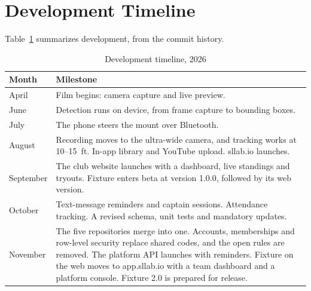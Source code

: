 \documentclass[letterpaper,11pt]{article}
\begin{document}


\section{Development Timeline}\label{a:timeline}

Table~\ref{t:timeline} summarizes development, from the commit history.

\begin{table}[H]
\caption{Development timeline, 2026}\label{t:timeline}
\footnotesize
\begin{tabularx}{\linewidth}{@{}l X@{}}
\toprule
Month & Milestone \\
\midrule
April & Film begins: camera capture and live preview. \\
June & Detection runs on device, from frame capture to bounding boxes. \\
July & The phone steers the mount over Bluetooth. \\
August & Recording moves to the ultra-wide camera, and tracking works at 10--15~ft. In-app library and YouTube upload. sllab.io launches. \\
September & The club website launches with a dashboard, live standings and tryouts. Fixture enters beta at version 1.0.0, followed by its web version. \\
October & Text-message reminders and captain sessions. Attendance tracking. A revised schema, unit tests and mandatory updates. \\
November & The five repositories merge into one. Accounts, memberships and row-level security replace shared codes, and the open rules are removed. The platform API launches with reminders. Fixture on the web moves to app.sllab.io with a team dashboard and a platform console. Fixture 2.0 is prepared for release. \\
\bottomrule
\end{tabularx}
\end{table}
\end{document}
